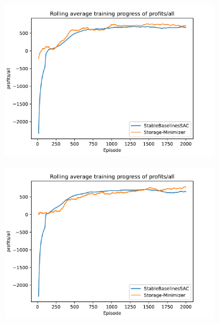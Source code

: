 \begin{figure}[!hbt]
	\centering
	\begin{subfigure}{0.49\textwidth}
		\centering
		\includegraphics[width = \textwidth]{images/experiments/SACDuopoly/SACDuopolyProfitsMean1.pdf}\\[1 ex]
		\label{fig:SACDuopolyProfitsMean1}
	\end{subfigure}
	\begin{subfigure}{0.49\textwidth}
		\centering
		\includegraphics[width = \textwidth]{images/experiments/SACDuopoly/SACDuopolyProfitsMean2.pdf}\\[1 ex]
		\label{fig:SACDuopolyProfitsMean2}
	\end{subfigure}

\end{figure}
